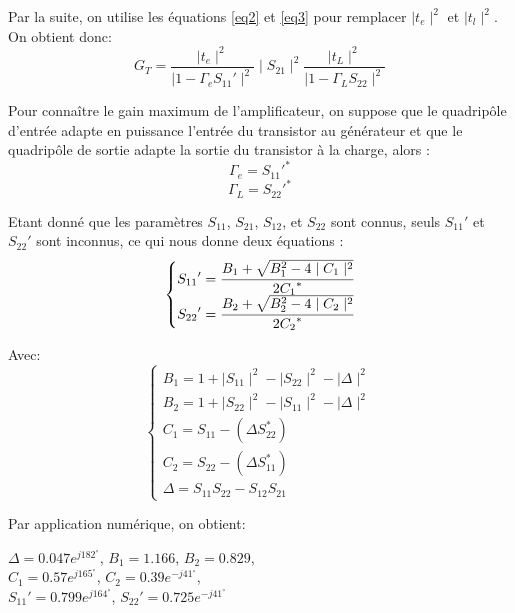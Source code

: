 \documentclass[french]{article}
\begin{document}
Par la suite, on utilise les équations \ref{eq2} et \ref{eq3} pour remplacer $\mid t_{e}\mid ^{2}$ et $\mid t_{l}\mid ^{2}$. On obtient donc:
\begin{equation}
	G_{T}=\frac{\mid t_{e}\mid ^{2}}{\mid 1-\Gamma_{e}{S_{11}}'\mid ^{2}}\mid S_{21}\mid ^{2}\frac{\mid t_{L}\mid ^{2}}{\mid 1-\Gamma_{L}S_{22}\mid^{2}}
\end{equation}

Pour connaître le gain maximum de l’amplificateur, on suppose que le quadripôle d’entrée adapte en puissance l’entrée du transistor au générateur et que le quadripôle de sortie adapte la sortie du transistor à la charge, alors :
\begin{equation}
	\Gamma_{e}={S_{11}}'^\ast
\end{equation}
\begin{equation}
	\Gamma_{L}={S_{22}}'^\ast
\end{equation}

Etant donné que les paramètres $S_{11}$, $S_{21}$, $S_{12}$, et $S_{22}$ sont connus, seuls ${S_{11}}'$ et ${S_{22}}'$ sont inconnus, ce qui nous donne deux équations :
\begin{equation}
	\left\{\begin{matrix}
		{S_{11}}'=\cfrac{B_{1}+\sqrt{B_{1}^{2}-4\mid C_{1}\mid^{2}}}{2{C_{1}}^\ast}\\
		{S_{22}}'=\cfrac{B_{2}+\sqrt{B_{2}^{2}-4\mid C_{2}\mid^{2}}}{2{C_{2}}^\ast}
	\end{matrix}\right.
\end{equation}

Avec:
\begin{equation}
	\left\{\begin{matrix}
		B_{1}=1+\mid S_{11}\mid^{2}-\mid S_{22}\mid^{2}-\mid \Delta \mid^{2}\\
		B_{2}=1+\mid S_{22}\mid^{2}-\mid S_{11}\mid^{2}-\mid \Delta \mid^{2}\\
		C_{1}=S_{11}-\left(\Delta S_{22}^\ast\right)\\
		C_{2}=S_{22}-\left(\Delta S_{11}^\ast\right)\\
		\Delta=S_{11}S_{22}-S_{12}S_{21}
	\end{matrix}\right.
\end{equation}

Par application numérique, on obtient:

{\centering
$\Delta=0.047e^{j182^{\circ}}$, $B_{1}=1.166$, $B_{2}=0.829$,\\ $C_{1}=0.57e^{j165^{\circ}}$, $C_{2}=0.39e^{-j41^{\circ}}$,\\ $S_{11}'=0.799e^{j164^{\circ}}$, $S_{22}'=0.725e^{-j41^{\circ}}$\\
}
\end{document}
